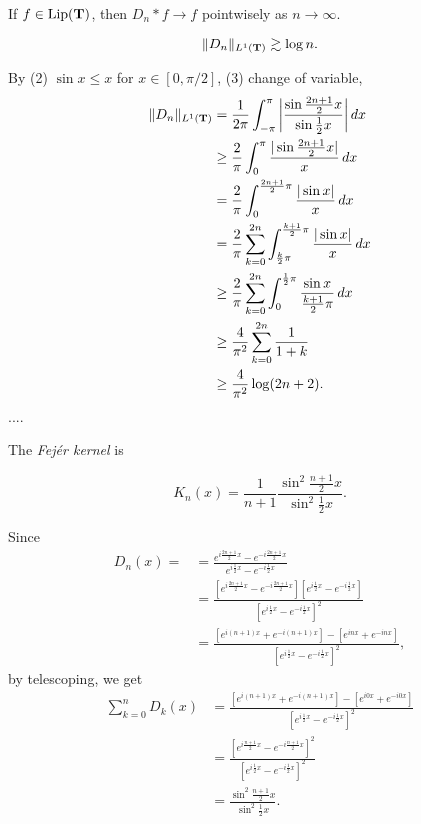 \documentclass{../crs}
\begin{document}
\begin{thm}
If $f\in\operatorname{Lip}(\mathbf{T})$, then $D_n*f\to f$ pointwisely as $n\to\infty$.
\end{thm}

\begin{thm}
\[\|D_n\|_{L^1(\mathbf{T})}\gtrsim\log n.\]
\end{thm}
\begin{pf}
By (2) $\sin x\le x$ for $x\in[0,\pi/2]$, (3) change of variable,
\begin{align*}
\|D_n\|_{L^1(\mathbf{T})}
&=\frac1{2\pi}\int_{-\pi}^\pi\left\lvert\frac{\sin\frac{2n+1}2x}{\sin\frac12x}\right\rvert dx\\
&\ge\frac2\pi\int_0^\pi\frac{|\sin\frac{2n+1}2x|}x\,dx\\
&=\frac2\pi\int_0^{\frac{2n+1}2\pi}\frac{|\sin x|}x\,dx\\
&=\frac2\pi\sum_{k=0}^{2n}\int_{\frac k2\pi}^{\frac{k+1}2\pi}\frac{|\sin x|}x\,dx\\
&\ge\frac2\pi\sum_{k=0}^{2n}\int_0^{\frac12\pi}\frac{\sin x}{\frac{k+1}2\pi}\,dx\\
&\ge\frac4{\pi^2}\sum_{k=0}^{2n}\frac1{1+k}\\
&\ge\frac4{\pi^2}\log(2n+2).
\end{align*}....
\end{pf}

\begin{defn}
The \emph{Fej\'er kernel} is
\end{defn}
\begin{thm}
\[K_n(x)=\frac1{n+1}\frac{\sin^2\frac{n+1}2x}{\sin^2\frac12x}.\]
\end{thm}
\begin{pf}
Since
\begin{align*}
D_n(x)=
&=\frac{e^{i\frac{2n+1}2x}-e^{-i\frac{2n+1}2x}}{e^{i\frac12x}-e^{-i\frac12x}}\\
&=\frac{[e^{i\frac{2n+1}2x}-e^{-i\frac{2n+1}2x}][e^{i\frac12x}-e^{-i\frac12x}]}{[e^{i\frac12x}-e^{-i\frac12x}]^2}\\
&=\frac{[e^{i(n+1)x}+e^{-i(n+1)x}]-[e^{inx}+e^{-inx}]}{[e^{i\frac12x}-e^{-i\frac12x}]^2},
\end{align*}
by telescoping, we get
\begin{align*}
\sum_{k=0}^nD_k(x)
&=\frac{[e^{i(n+1)x}+e^{-i(n+1)x}]-[e^{i0x}+e^{-i0x}]}{[e^{i\frac12x}-e^{-i\frac12x}]^2}\\
&=\frac{[e^{i\frac{n+1}2x}-e^{-i\frac{n+1}2x}]^2}{[e^{i\frac12x}-e^{-i\frac12x}]^2}\\
&=\frac{\sin^2\frac{n+1}2x}{\sin^2\frac12x}.
\end{align*}
\end{pf}
\end{document}

